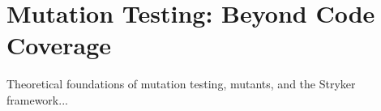 \chapter{Mutation Testing: Beyond Code Coverage}
\label{chap:mutation_testing}

Theoretical foundations of mutation testing, mutants, and the Stryker framework...
